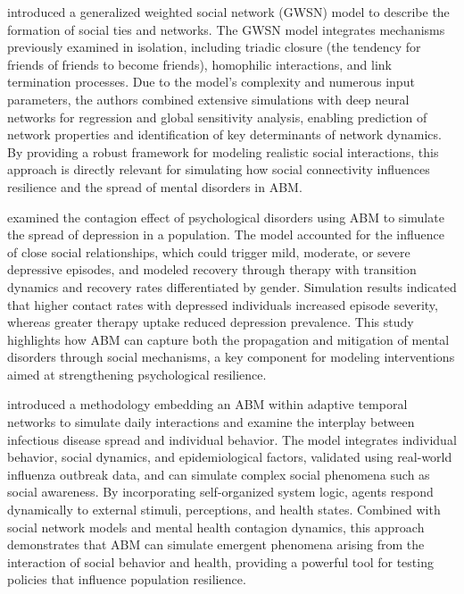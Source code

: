 \documentclass[
  letterpaper,
  DIV=11,
  numbers=noendperiod]{scrartcl}
\begin{document}
\citet{Murase2021} introduced a generalized weighted social network
(GWSN) model to describe the formation of social ties and networks. The
GWSN model integrates mechanisms previously examined in isolation,
including triadic closure (the tendency for friends of friends to become
friends), homophilic interactions, and link termination processes. Due
to the model's complexity and numerous input parameters, the authors
combined extensive simulations with deep neural networks for regression
and global sensitivity analysis, enabling prediction of network
properties and identification of key determinants of network dynamics.
By providing a robust framework for modeling realistic social
interactions, this approach is directly relevant for simulating how
social connectivity influences resilience and the spread of mental
disorders in ABM.

\citet{Andarlia2021} examined the contagion effect of psychological
disorders using ABM to simulate the spread of depression in a
population. The model accounted for the influence of close social
relationships, which could trigger mild, moderate, or severe depressive
episodes, and modeled recovery through therapy with transition dynamics
and recovery rates differentiated by gender. Simulation results
indicated that higher contact rates with depressed individuals increased
episode severity, whereas greater therapy uptake reduced depression
prevalence. This study highlights how ABM can capture both the
propagation and mitigation of mental disorders through social
mechanisms, a key component for modeling interventions aimed at
strengthening psychological resilience.

\citet{Lopez2024} introduced a methodology embedding an ABM within
adaptive temporal networks to simulate daily interactions and examine
the interplay between infectious disease spread and individual behavior.
The model integrates individual behavior, social dynamics, and
epidemiological factors, validated using real-world influenza outbreak
data, and can simulate complex social phenomena such as social
awareness. By incorporating self-organized system logic, agents respond
dynamically to external stimuli, perceptions, and health states.
Combined with social network models and mental health contagion
dynamics, this approach demonstrates that ABM can simulate emergent
phenomena arising from the interaction of social behavior and health,
providing a powerful tool for testing policies that influence population
resilience.
\end{document}
